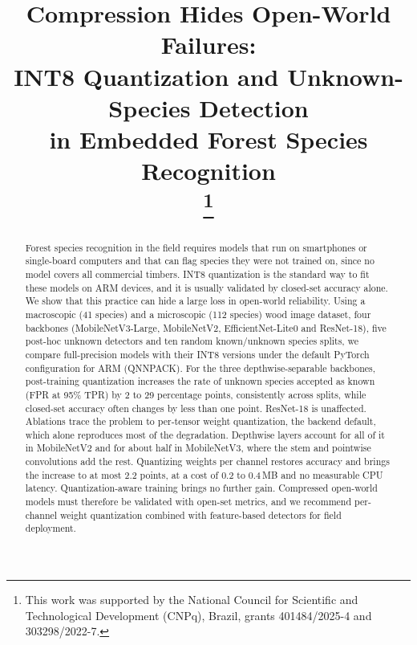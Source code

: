 \documentclass[conference]{IEEEtran}
\newcommand{\todo}[1]{\textcolor{red}{[TODO: #1]}}
\begin{document}
\title{Compression Hides Open-World Failures:\\INT8 Quantization and Unknown-Species Detection\\in Embedded Forest Species Recognition\\
\thanks{This work was supported by the National Council for Scientific and Technological Development (CNPq), Brazil, grants 401484/2025-4 and 303298/2022-7.}}

\author{\IEEEauthorblockN{\todo{authors}}
\IEEEauthorblockA{\todo{affiliations}}}

\maketitle

\begin{abstract}
Forest species recognition in the field requires models that run on smartphones or single-board computers and that can flag species they were not trained on, since no model covers all commercial timbers. INT8 quantization is the standard way to fit these models on ARM devices, and it is usually validated by closed-set accuracy alone. We show that this practice can hide a large loss in open-world reliability. Using a macroscopic (41 species) and a microscopic (112 species) wood image dataset, four backbones (MobileNetV3-Large, MobileNetV2, EfficientNet-Lite0 and ResNet-18), five post-hoc unknown detectors and ten random known/unknown species splits, we compare full-precision models with their INT8 versions under the default PyTorch configuration for ARM (QNNPACK). For the three depthwise-separable backbones, post-training quantization increases the rate of unknown species accepted as known (FPR at 95\% TPR) by 2 to 29 percentage points, consistently across splits, while closed-set accuracy often changes by less than one point. ResNet-18 is unaffected. Ablations trace the problem to per-tensor weight quantization, the backend default, which alone reproduces most of the degradation. Depthwise layers account for all of it in MobileNetV2 and for about half in MobileNetV3, where the stem and pointwise convolutions add the rest. Quantizing weights per channel restores accuracy and brings the increase to at most 2.2 points, at a cost of 0.2 to 0.4\,MB and no measurable CPU latency. Quantization-aware training brings no further gain. Compressed open-world models must therefore be validated with open-set metrics, and we recommend per-channel weight quantization combined with feature-based detectors for field deployment.
\end{abstract}
\end{document}
